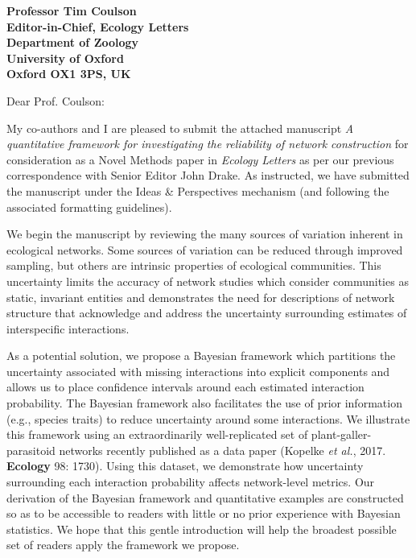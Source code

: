 \documentclass[12pt]{letter}
\begin{document}
\begin{letter}{\bf Professor Tim Coulson\\
               Editor-in-Chief, Ecology Letters\\
               Department of Zoology\\
               University of Oxford\\
               Oxford OX1 3PS, UK
                               }


\opening{Dear Prof. Coulson:}

    My co-authors and I are pleased to submit the attached manuscript \emph{A quantitative framework for investigating the reliability of network construction} for consideration as a Novel Methods paper in \emph{Ecology Letters} as per our previous correspondence with Senior Editor John Drake. As instructed, we have submitted the manuscript under the Ideas \& Perspectives mechanism (and following the associated formatting guidelines).


    We begin the manuscript by reviewing the many sources of variation inherent in ecological networks. Some sources of variation can be reduced through improved sampling, but others are intrinsic properties of ecological communities. This uncertainty limits the accuracy of network studies which consider communities as static, invariant entities and demonstrates the need for descriptions of network structure that acknowledge and address the uncertainty surrounding estimates of interspecific interactions.


    As a potential solution, we propose a Bayesian framework which partitions the uncertainty associated with missing interactions into explicit components and allows us to place confidence intervals around each estimated interaction probability. The Bayesian framework also facilitates the use of prior information (e.g., species traits) to reduce uncertainty around some interactions. We illustrate this framework using an extraordinarily  well-replicated set of plant-galler-parasitoid networks recently published as a data paper (Kopelke \emph{et al.}, 2017. \textbf{Ecology} 98: 1730). Using this dataset, we demonstrate how uncertainty surrounding each interaction probability affects network-level metrics. Our derivation of the Bayesian framework and quantitative examples are constructed so as to be accessible to readers with little or no prior experience with Bayesian statistics. We hope that this gentle introduction will help the broadest possible set of readers apply the framework we propose.



\end{letter}
\end{document}
